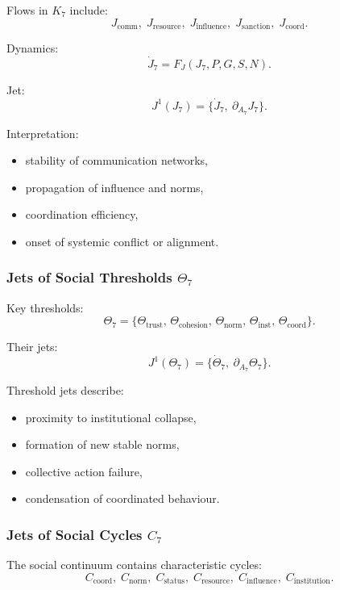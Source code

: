 Flows in $K_7$ include:
\[
J_{\mathrm{comm}},\;
J_{\mathrm{resource}},\;
J_{\mathrm{influence}},\;
J_{\mathrm{sanction}},\;
J_{\mathrm{coord}}.
\]

Dynamics:
\[
\dot{J}_7 = F_J(J_7, P, G, S, N).
\]

Jet:
\[
J^1(J_7)=\{\dot{J}_7,\ \partial_{A_7}J_7\}.
\]

Interpretation:
\begin{itemize}
    \item stability of communication networks,
    \item propagation of influence and norms,
    \item coordination efficiency,
    \item onset of systemic conflict or alignment.
\end{itemize}


\subsubsection{Jets of Social Thresholds \texorpdfstring{$\Theta_7$}{\Theta_7}}

Key thresholds:
\[
\Theta_7 =
\{
\Theta_{\mathrm{trust}},\,
\Theta_{\mathrm{cohesion}},\,
\Theta_{\mathrm{norm}},\,
\Theta_{\mathrm{inst}},\,
\Theta_{\mathrm{coord}}
\}.
\]

Their jets:
\[
J^1(\Theta_7)=\{\dot{\Theta}_7,\ \partial_{A_7}\Theta_7\}.
\]

Threshold jets describe:
\begin{itemize}
    \item proximity to institutional collapse,
    \item formation of new stable norms,
    \item collective action failure,
    \item condensation of coordinated behaviour.
\end{itemize}


\subsubsection{Jets of Social Cycles \texorpdfstring{$C_7$}{C_7}}

The social continuum contains characteristic cycles:
\[
C_{\mathrm{coord}},\;
C_{\mathrm{norm}},\;
C_{\mathrm{status}},\;
C_{\mathrm{resource}},\;
C_{\mathrm{influence}},\;
C_{\mathrm{institution}}.
\]

